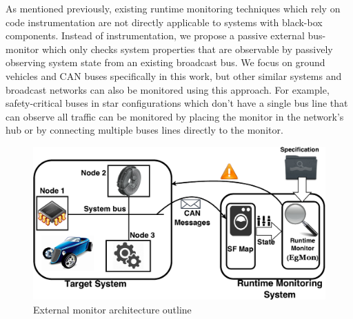 
As mentioned previously, existing runtime monitoring techniques which rely on code instrumentation are not directly applicable to systems with black-box components.
Instead of instrumentation, we propose a passive external bus-monitor which only checks system properties that are observable by passively observing system state from an existing broadcast bus.
We focus on ground vehicles and CAN buses specifically in this work, but other similar systems and broadcast networks can also be monitored using this approach.
For example, safety-critical buses in star configurations which don't have a single bus line that can observe all traffic can be monitored by placing the monitor in the network's hub or by connecting multiple buses lines directly to the monitor. 

\begin{figure}[!h]
\centering 
\includegraphics[scale=0.5]{img/ARV-main.pdf}
\caption{External monitor architecture outline \label{fig:architecture}}
\end{figure}


